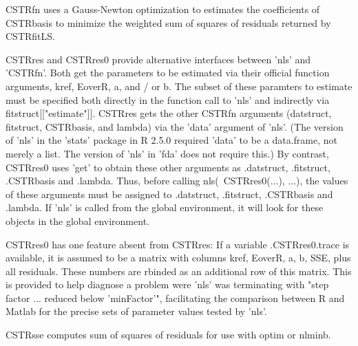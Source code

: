 \documentclass{article}
\begin{document}
\begin{Details}
CSTRfn uses a Gauss-Newton optimization to estimates the coefficients
of CSTRbasis to minimize the weighted sum of squares of residuals
returned by CSTRfitLS.  

CSTRres and CSTRres0 provide alternative interfaces between 'nls' and
'CSTRfn'.  Both get the parameters to be estimated via their official
function arguments, kref, EoverR, a, and / or b.  The subset of these
paramters to estimate must be specified both directly in the function
call to 'nls' and indirectly via fitstruct[["estimate"]].  CSTRres
gets the other CSTRfn arguments (datstruct, fitstruct, CSTRbasis, and
lambda) via the 'data' argument of 'nls'.  (The version of 'nls' in
the 'stats' package in R 2.5.0 required 'data' to be a data.frame, not
merely a list.  The version of 'nls' in 'fda' does not require this.)
By contrast, CSTRres0 uses 'get' to obtain these other arguments as
.datstruct, .fitstruct, .CSTRbasis and .lambda.  Thus, before calling
nls(~CSTRres0(...), ...), the values of these arguments must be
assigned to .datstruct, .fitstruct, .CSTRbasis and .lambda.  If 'nls'
is called from the global environment, it will look for these objects
in the global environment.

CSTRres0 has one feature absent from CSTRres:  If a variable
.CSTRres0.trace is available, it is assumed to be a matrix with columns
kref, EoverR, a, b, SSE, plus all residuals.  These numbers are
rbinded as an additional row of this matrix.  This is provided to help
diagnose a problem were 'nls' was terminating with "step factor
... reduced below 'minFactor'", facilitating the comparison between R
and Matlab for the precise sets of parameter values tested by 'nls'.    

CSTRsse computes sum of squares of residuals for use with optim or
nlminb.
\end{Details}
\end{document}
